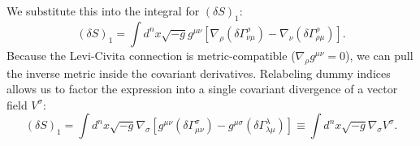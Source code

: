 \documentclass[11pt, a4paper]{report}
\begin{document}
We substitute this into the integral for $(\delta S)_{1}$:
\begin{equation}
(\delta S)_{1} = \int d^{n}x \sqrt{-g} g^{\mu\nu} \left[ \nabla_{\rho}(\delta\Gamma^{\rho}_{\nu\mu}) - \nabla_{\nu}(\delta\Gamma^{\rho}_{\rho\mu}) \right].
\end{equation}
Because the Levi-Civita connection is metric-compatible ($\nabla_{\rho}g^{\mu\nu}=0$), we can pull the inverse metric inside the covariant derivatives. Relabeling dummy indices allows us to factor the expression into a single covariant divergence of a vector field $V^{\sigma}$:
\begin{equation}
\label{eq:delta_s1_divergence}
(\delta S)_{1} = \int d^{n}x \sqrt{-g} \nabla_{\sigma} \left[ g^{\mu\nu}(\delta\Gamma^{\sigma}_{\mu\nu}) - g^{\mu\sigma}(\delta\Gamma^{\lambda}_{\lambda\mu}) \right] \equiv \int d^{n}x \sqrt{-g} \nabla_{\sigma} V^{\sigma}.
\end{equation}
\end{document}
